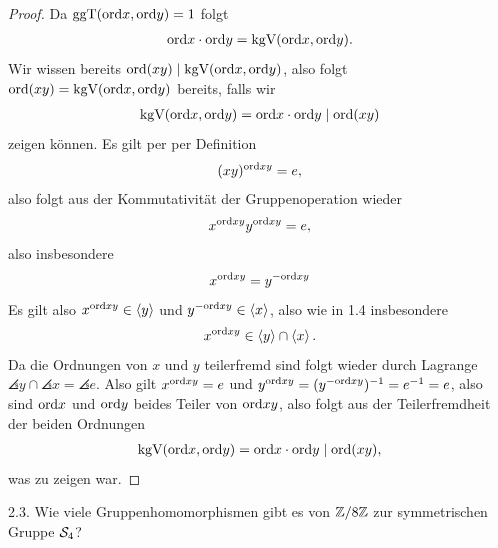 \documentclass{article}
\newcommand{\ex}[1]{\tit{Übung} #1.}
\begin{document}
		\begin{proof}
			Da $\textnormal{ggT}(\textnormal{ord} x, \textnormal{ord} y) = 1$ folgt 
			\begin{align*}
				\textnormal{ord} x \cdot \textnormal{ord} y = \textnormal{kgV}(\textnormal{ord} x, \textnormal{ord} y).
			\end{align*} 
			Wir wissen bereits $\textnormal{ord}(xy) \mid \textnormal{kgV}(\textnormal{ord} x, \textnormal{ord} y)$, also folgt $\textnormal{ord}(xy) = \textnormal{kgV}(\textnormal{ord} x, \textnormal{ord} y)$ bereits, falls wir 
			\begin{align*}
				\textnormal{kgV}(\textnormal{ord} x, \textnormal{ord} y) = \textnormal{ord} x \cdot \textnormal{ord} y \mid \textnormal{ord}(xy)
			\end{align*} zeigen können.
			\newpar
			Es gilt per per Definition 
			\begin{align*}
				(xy)^{\textnormal{ord} xy} = e,
			\end{align*}
			also folgt aus der Kommutativität der Gruppenoperation wieder
			\begin{align*}
				x^{\textnormal{ord} xy} y^{\textnormal{ord} xy} = e,
			\end{align*}
			also insbesondere
			\begin{align*}
				x^{\textnormal{ord} xy} = y^{-{\textnormal{ord} xy}}
			\end{align*}
			Es gilt also $x^{\textnormal{ord} xy} \in \left\langle y \right\rangle$ und $y^{-{\textnormal{ord} xy}} \in \left\langle x \right\rangle$, also wie in 1.4 insbesondere 
			\begin{align*}
				x^{\textnormal{ord} xy} \in \left\langle y \right\rangle \cap \left\langle x \right\rangle.
			\end{align*}
			Da die Ordnungen von $x$ und $y$ teilerfremd sind folgt wieder durch Lagrange $\angles{y} \cap \angles{x} = \angles{e}$. Also gilt $x^{\textnormal{ord} xy} = e$ und $y^{\textnormal{ord} xy} = (y^{-{\textnormal{ord} xy}})^{-1} = e^{-1} = e$, also sind $\textnormal{ord} x$ und $\textnormal{ord} y$ beides Teiler von $\textnormal{ord} xy$, also folgt aus der Teilerfremdheit der beiden Ordnungen
			\begin{align*}
				\textnormal{kgV}(\textnormal{ord} x, \textnormal{ord} y) = \textnormal{ord} x \cdot \textnormal{ord} y \mid \textnormal{ord}(xy),
			\end{align*}
			was zu zeigen war.
		\end{proof}
		\newpar
		\ex{2.3} Wie viele Gruppenhomomorphismen gibt es von $\mathbb{Z}/8\mathbb{Z}$ zur symmetrischen Gruppe $\mathcal{S}_4$?
\end{document}
